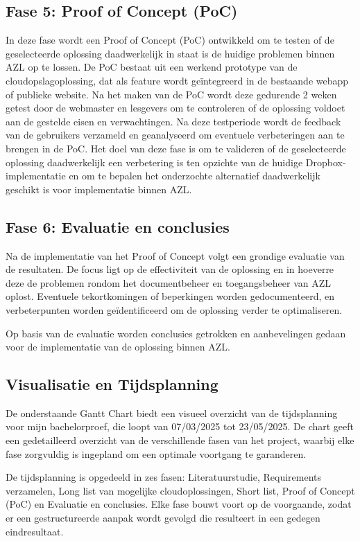 \subsection{Fase 5: Proof of Concept (PoC)}
In deze fase wordt een Proof of Concept (PoC) ontwikkeld om te testen of de geselecteerde oplossing daadwerkelijk in staat is de huidige problemen binnen AZL op te lossen. De PoC bestaat uit een werkend prototype van de cloudopslagoplossing, dat als feature wordt geïntegreerd in de bestaande webapp of publieke website. Na het maken van de PoC wordt deze gedurende 2 weken getest door de webmaster en lesgevers om te controleren of de oplossing voldoet aan de gestelde eisen en verwachtingen. Na deze testperiode wordt de feedback van de gebruikers verzameld en geanalyseerd om eventuele verbeteringen aan te brengen in de PoC. Het doel van deze fase is om te valideren of de geselecteerde oplossing daadwerkelijk een verbetering is ten opzichte van de huidige Dropbox-implementatie en om te bepalen het onderzochte alternatief daadwerkelijk geschikt is voor implementatie binnen AZL.
\subsection{Fase 6: Evaluatie en conclusies}
Na de implementatie van het Proof of Concept volgt een grondige evaluatie van de resultaten. De focus ligt op de effectiviteit van de oplossing en in hoeverre deze de problemen rondom het documentbeheer en toegangsbeheer van AZL oplost. Eventuele tekortkomingen of beperkingen worden gedocumenteerd, en verbeterpunten worden geïdentificeerd om de oplossing verder te optimaliseren.

Op basis van de evaluatie worden conclusies getrokken en aanbevelingen gedaan voor de implementatie van de oplossing binnen AZL.
\subsection{Visualisatie en Tijdsplanning}
De onderstaande Gantt Chart biedt een visueel overzicht van de tijdsplanning voor mijn bachelorproef, die loopt van 07/03/2025 tot 23/05/2025. De chart geeft een gedetailleerd overzicht van de verschillende fasen van het project, waarbij elke fase zorgvuldig is ingepland om een optimale voortgang te garanderen.

De tijdsplanning is opgedeeld in zes fasen: Literatuurstudie, Requirements verzamelen, Long list van mogelijke cloudoplossingen, Short list, Proof of Concept (PoC) en Evaluatie en conclusies. Elke fase bouwt voort op de voorgaande, zodat er een gestructureerde aanpak wordt gevolgd die resulteert in een gedegen eindresultaat.

